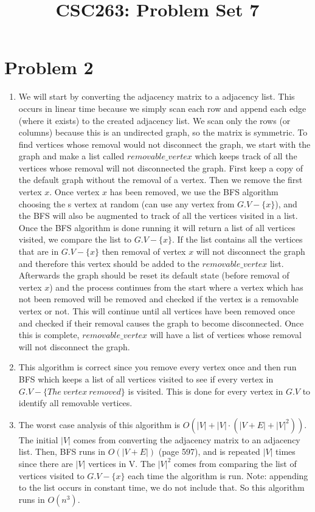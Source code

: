\documentclass{article}
\title{CSC263: Problem Set 7}
\date{\vspace{-5ex}}
\begin{document}
\maketitle
\section{Problem 2}

\begin{enumerate}[label=(\alph*)]

\item We will start by converting the adjacency matrix to a adjacency list. This occurs in linear time because we simply scan each row and append each edge (where it exists) to the created adjacency list. We scan only the rows (or columns) because this is an undirected graph, so the matrix is symmetric. To find vertices whose removal would not disconnect the graph, we start with the graph and make a list called $removable\_vertex$ which keeps track of all the vertices whose removal will not disconnected the graph. First keep a copy of the default graph without the removal of a vertex. Then we remove the first vertex $x$. Once vertex $x$ has been removed, we use the BFS algorithm choosing the s vertex at random (can use any vertex from $G.V - \{x\}$), and the BFS will also be augmented to track of all the vertices visited in a list. Once the BFS algorithm is done running it will return a list of all vertices visited, we compare the list to $G.V - \{x\}$. If the list contains all the vertices that are in $G.V - \{x\}$ then removal of vertex $x$ will not disconnect the graph and therefore this vertex should be added to the $removable\_vertex$ list. Afterwards the graph should be reset its default state (before removal of vertex $x$) and the process continues from the start where a vertex which has not been removed will be removed and checked if the vertex is a removable vertex or not. This will continue until all vertices have been removed once and checked if their removal causes the graph to become disconnected. Once this is complete, $removable\_vertex$ will have a list of vertices whose removal will not disconnect the graph.



\item This algorithm is correct since you remove every vertex once and then run BFS which keeps a list of all vertices visited to see if every vertex in $G.V - \{The\ vertex\ removed\}$ is visited. This is done for every vertex in $G.V$ to identify all removable vertices.



\item The worst case analysis of this algorithm is $O(|V| + |V| \cdot (|V + E| + |V|^2))$. The initial $|V|$ comes from converting the adjacency matrix to an adjacency list. Then, BFS runs in $O(|V+E|)$ (page 597), and is repeated $|V|$ times since there are $|V|$ vertices in V. The $|V|^2$ comes from comparing the list of vertices visited to $G.V - \{x\}$ each time the algorithm is run. Note: appending to the list occurs in constant time, we do not include that. So this algorithm runs in $O(n^3)$. 
\end{enumerate}
\end{document}
